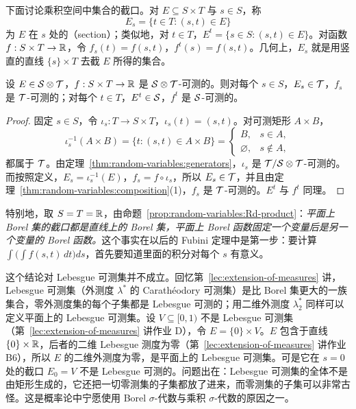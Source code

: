 下面讨论乘积空间中集合的截口。对 $E\subseteq S\times T$ 与 $s\in S$，称
\[
E_s=\{t\in T:(s,t)\in E\}
\]
为 $E$ 在 $s$ 处的（section）；类似地，对 $t\in T$，$E^t=\{s\in S:(s,t)\in E\}$。对函数 $f:S\times T\to\mathbb{R}$，令 $f_s(t)=f(s,t)$，$f^t(s)=f(s,t)$。几何上，$E_s$ 就是用竖直的直线 $\{s\}\times T$ 去截 $E$ 所得的集合。

\begin{theorem}[截口的可测性]\label{thm:random-variables:sections}
设 $E\in\mathcal{S}\otimes\mathcal{T}$，$f:S\times T\to\mathbb{R}$ 是 $\mathcal{S}\otimes\mathcal{T}$-可测的。则对每个 $s\in S$，$E_s\in\mathcal{T}$，$f_s$ 是 $\mathcal{T}$-可测的；对每个 $t\in T$，$E^t\in\mathcal{S}$，$f^t$ 是 $\mathcal{S}$-可测的。
\end{theorem}
\begin{proof}
固定 $s\in S$，令 $\iota_s:T\to S\times T$，$\iota_s(t)=(s,t)$。对可测矩形 $A\times B$，
\[
\iota_s^{-1}(A\times B)=\{t:(s,t)\in A\times B\}=\begin{cases}B,&s\in A,\\ \varnothing,&s\notin A,\end{cases}
\]
都属于 $\mathcal{T}$。由定理~\ref{thm:random-variables:generators}，$\iota_s$ 是 $\mathcal{T}/\mathcal{S}\otimes\mathcal{T}$-可测的。而按照定义，$E_s=\iota_s^{-1}(E)$，$f_s=f\circ\iota_s$，所以 $E_s\in\mathcal{T}$，并且由定理~\ref{thm:random-variables:composition}(1)，$f_s$ 是 $\mathcal{T}$-可测的。$E^t$ 与 $f^t$ 同理。
\end{proof}

特别地，取 $S=T=\mathbb{R}$，由命题~\ref{prop:random-variables:Rd-product}：\emph{平面上 Borel 集的截口都是直线上的 Borel 集，平面上 Borel 函数固定一个变量后是另一个变量的 Borel 函数。}这个事实在以后的 Fubini 定理中是第一步：要计算 $\int\bigl(\int f(s,t)\,dt\bigr)ds$，首先要知道里面的积分对每个 $s$ 有意义。

\begin{remark}
这个结论对 Lebesgue 可测集并不成立。回忆第~\ref{lec:extension-of-measures} 讲，Lebesgue 可测集（外测度 $\lambda^*$ 的 Carathéodory 可测集）是比 Borel 集更大的一族集合，零外测度集的每个子集都是 Lebesgue 可测的；用二维外测度 $\lambda_2^*$ 同样可以定义平面上的 Lebesgue 可测集。设 $V\subseteq[0,1)$ 不是 Lebesgue 可测集（第~\ref{lec:extension-of-measures} 讲作业 D），令 $E=\{0\}\times V$。$E$ 包含于直线 $\{0\}\times\mathbb{R}$，后者的二维 Lebesgue 测度为零（第~\ref{lec:extension-of-measures} 讲作业 B6），所以 $E$ 的二维外测度为零，是平面上的 Lebesgue 可测集。可是它在 $s=0$ 处的截口 $E_0=V$ 不是 Lebesgue 可测的。问题出在：Lebesgue 可测集的全体不是由矩形生成的，它还把一切零测集的子集都放了进来，而零测集的子集可以非常古怪。这是概率论中宁愿使用 Borel $\sigma$-代数与乘积 $\sigma$-代数的原因之一。
\end{remark}

